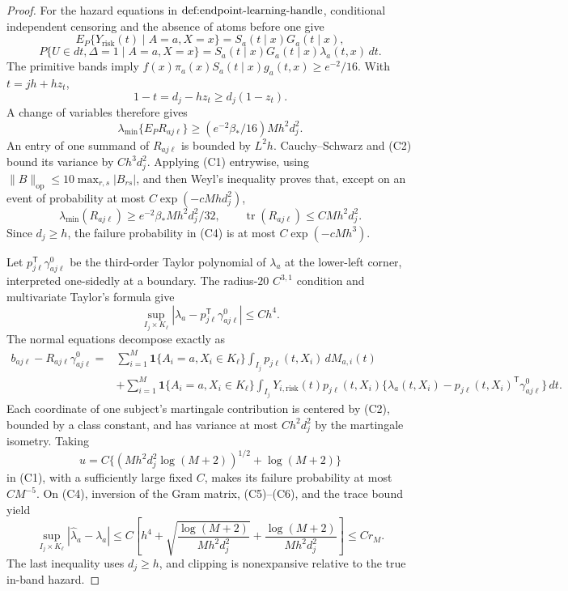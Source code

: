 \documentclass{article}
\begin{document}
\begin{proof}
For the hazard equations in \(\textnormal{def:endpoint-learning-handle}\), conditional independent censoring and the absence of atoms before one give
\[
 E_P\{Y_{\mathrm{risk}}(t)\mid A=a,X=x\}=S_a(t\mid x)G_a(t\mid x),
\]
\[
 P\{U\in dt,\Delta=1\mid A=a,X=x\}
 =S_a(t\mid x)G_a(t\mid x)\lambda_a(t,x)\,dt.                         \tag{C2}
\]
The primitive bands imply \(f(x)\pi_a(x)S_a(t\mid x)g_a(t,x)\ge e^{-2}/16\).  With \(t=jh+hz_t\),
\[
 1-t=d_j-hz_t\ge d_j(1-z_t).
\]
A change of variables therefore gives
\[
 \lambda_{\min}\{E_PR_{aj\ell}\}
 \ge(e^{-2}\beta_*/16)Mh^2d_j^2.                                     \tag{C3}
\]
An entry of one summand of \(R_{aj\ell}\) is bounded by \(L^2h\).  Cauchy--Schwarz and (C2) bound its variance by \(Ch^3d_j^2\).  Applying (C1) entrywise, using \(\lVert B\rVert_{\mathrm{op}}\le10\max_{r,s}|B_{rs}|\), and then Weyl's inequality proves that, except on an event of probability at most \(C\exp(-cMhd_j^2)\),
\[
 \lambda_{\min}(R_{aj\ell})\ge e^{-2}\beta_*Mh^2d_j^2/32,
 \qquad \operatorname{tr}(R_{aj\ell})\le CMh^2d_j^2.                 \tag{C4}
\]
Since \(d_j\ge h\), the failure probability in (C4) is at most \(C\exp(-cMh^3)\).

Let \(p_{j\ell}^{\mathsf T}\gamma^0_{aj\ell}\) be the third-order Taylor polynomial of \(\lambda_a\) at the lower-left corner, interpreted one-sidedly at a boundary.  The radius-\(20\) \(C^{3,1}\) condition and multivariate Taylor's formula give
\[
 \sup_{I_j\times K_\ell}|\lambda_a-p_{j\ell}^{\mathsf T}\gamma^0_{aj\ell}|
 \le Ch^4.                                                            \tag{C5}
\]
The normal equations decompose exactly as
\[
 \begin{split}
 b_{aj\ell}-R_{aj\ell}\gamma^0_{aj\ell}
 ={}&\sum_{i=1}^M\mathbf 1\{A_i=a,X_i\in K_\ell\}
       \int_{I_j}p_{j\ell}(t,X_i)\,dM_{a,i}(t)\\
 &+\sum_{i=1}^M\mathbf 1\{A_i=a,X_i\in K_\ell\}
       \int_{I_j}Y_{i,\mathrm{risk}}(t)p_{j\ell}(t,X_i)
       \{\lambda_a(t,X_i)-p_{j\ell}(t,X_i)^{\mathsf T}\gamma^0_{aj\ell}\}\,dt.
                                                                            \tag{C6}
 \end{split}
\]
Each coordinate of one subject's martingale contribution is centered by (C2), bounded by a class constant, and has variance at most \(Ch^2d_j^2\) by the martingale isometry.  Taking
\[
 u=C\{(Mh^2d_j^2\log(M+2))^{1/2}+\log(M+2)\}
\]
in (C1), with a sufficiently large fixed \(C\), makes its failure probability at most \(CM^{-5}\).  On (C4), inversion of the Gram matrix, (C5)--(C6), and the trace bound yield
\[
 \sup_{I_j\times K_\ell}|\widehat\lambda_a-\lambda_a|
 \le C\left[h^4+\sqrt{\frac{\log(M+2)}{Mh^2d_j^2}}
 +\frac{\log(M+2)}{Mh^2d_j^2}\right]\le Cr_M.                        \tag{C7}
\]
The last inequality uses \(d_j\ge h\), and clipping is nonexpansive relative to the true in-band hazard.


\end{proof}
\end{document}
